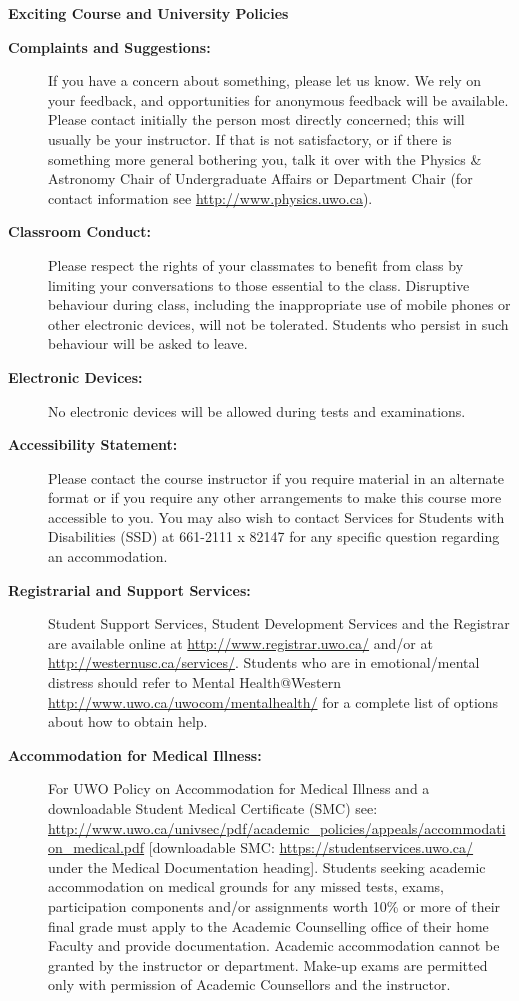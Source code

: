 \documentclass[12pt]{article}
\begin{document}
\begin{center}
{\large \bf Exciting Course and University Policies}\\
\end{center}

\begin{description}
\item[\bf Complaints and Suggestions:]
If you have a concern about something, please let us know. We rely on your feedback, and opportunities for anonymous feedback will be available. Please contact initially the person most directly concerned; this will usually be your instructor. If that is not satisfactory, or if there is something more general bothering you, talk it over with the Physics \& Astronomy Chair of Undergraduate Affairs or Department Chair (for contact information see \url{http://www.physics.uwo.ca}).

\item[\bf Classroom Conduct:]
Please respect the rights of your classmates to benefit from class by limiting your conversations to those essential to the class. 
Disruptive behaviour during class, including the inappropriate use of mobile phones or other electronic devices, will not be tolerated. 
Students who persist in such behaviour will be asked to leave.

\item[\bf Electronic Devices:] No electronic devices will be allowed during tests and examinations.

\item[\bf Accessibility Statement:] Please contact the course instructor if you require material in an alternate format or if you require any other arrangements to make this course more accessible to you. You may also wish to contact Services for Students with Disabilities (SSD) at 661-2111 x 82147 for any specific question regarding an accommodation.

\item[\bf Registrarial and Support Services:] Student Support Services, Student Development Services and the Registrar are available online at 
\url{http://www.registrar.uwo.ca/} and/or at \url{http://westernusc.ca/services/}. Students who are in emotional/mental distress should refer to Mental Health@Western 
\url{http://www.uwo.ca/uwocom/mentalhealth/} for a complete list of options about how to obtain help.

\item[\bf Accommodation for Medical Illness:] For UWO Policy on Accommodation for Medical Illness and a downloadable 
 Student Medical Certificate (SMC) see:
\url{http://www.uwo.ca/univsec/pdf/academic_policies/appeals/accommodation_medical.pdf}
[downloadable SMC: \url{https://studentservices.uwo.ca/} under the Medical Documentation heading].
Students seeking academic accommodation on medical grounds for any missed tests, exams,
participation components and/or assignments worth 10\% or more of their final grade must apply to
the Academic Counselling office of their home Faculty and provide documentation. Academic
accommodation cannot be granted by the instructor or department. Make-up exams are permitted
only with permission of Academic Counsellors and the instructor.


\end{description}
\end{document}
